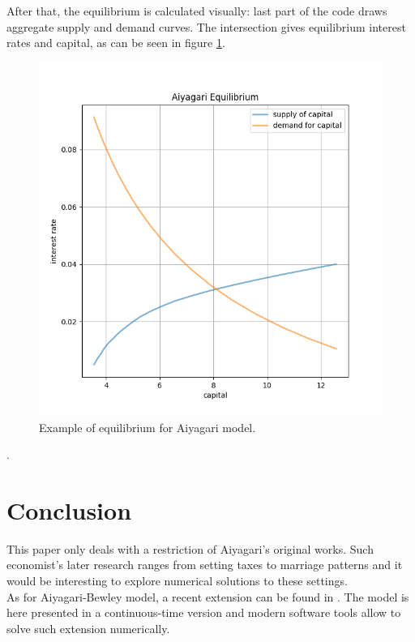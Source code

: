 \documentclass[12pt]{article}
\begin{document}
After that, the equilibrium is calculated visually: last part of the code draws aggregate supply and demand curves. The intersection gives equilibrium interest rates and capital, as can be seen in figure \ref{plot:equilibrium}.
\begin{figure}[]
\centering
\caption{Example of equilibrium for Aiyagari model.}
\label{plot:equilibrium}
\includegraphics[scale = 0.8]{equilibrium.png}
\end{figure}
.

\newpage
\section{Conclusion}
This paper only deals with a restriction of Aiyagari's original works. Such economist's later research ranges from setting taxes to marriage patterns and it would be interesting to explore numerical solutions to these settings. \\
As for Aiyagari-Bewley model, a recent extension can be found in \cite{aiyacont}. The model is here presented in a continuous-time version and modern software tools allow to solve such extension numerically.

\newpage
\listoffigures
\end{document}

